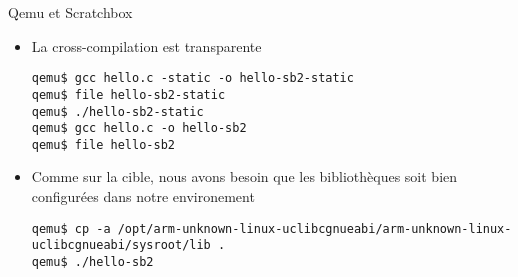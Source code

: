 \begin{frame}[fragile=singleslide]{Qemu et Scratchbox}
  \begin{itemize} 
  \item La cross-compilation est transparente
    \begin{lstlisting} 
qemu$ gcc hello.c -static -o hello-sb2-static
qemu$ file hello-sb2-static
qemu$ ./hello-sb2-static
qemu$ gcc hello.c -o hello-sb2
qemu$ file hello-sb2
    \end{lstlisting}
  \item Comme  sur la cible,  nous avons besoin que  les bibliothèques
    soit bien configurées dans notre environement
    \begin{lstlisting} 
qemu$ cp -a /opt/arm-unknown-linux-uclibcgnueabi/arm-unknown-linux-uclibcgnueabi/sysroot/lib .
qemu$ ./hello-sb2
    \end{lstlisting} 
  \end{itemize} 
\end{frame}




